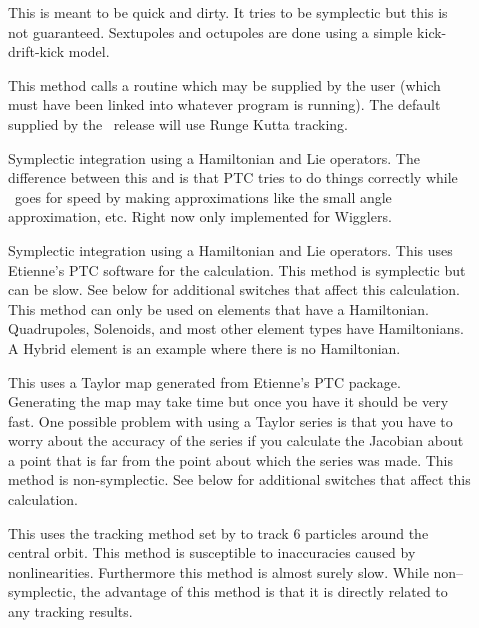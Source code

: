 \begin{description}

\item[]
This is meant to be quick and dirty. It tries to be symplectic but this
is not guaranteed. Sextupoles and octupoles are done using a simple
kick-drift-kick model.

\item[]
This method calls a routine  which may be supplied
by the user (which must have been linked into whatever program is
running).  The default  supplied by the \bmad\ release
will use Runge Kutta tracking. 

\item[]
Symplectic integration using a Hamiltonian and Lie operators. The
difference between this and  is that PTC tries to do things
correctly while \bmad\ goes for speed by making approximations like the small
angle approximation, etc. Right now only implemented for Wigglers.

\item[]
Symplectic integration using a Hamiltonian and Lie operators.
This uses Etienne's PTC software for the calculation.
This method is symplectic but can be slow. See below for additional switches
that affect this calculation. This method can only be used on elements that
have a Hamiltonian. Quadrupoles, Solenoids, and most other element types have
Hamiltonians. A Hybrid element is an example where there is no Hamiltonian.

\item[]
This uses a Taylor map generated from Etienne's PTC package. Generating
the map may take time but once you have it should be very fast. One
possible problem with using a Taylor series is that you have to worry about
the accuracy of the series if you calculate the Jacobian about a point that is
far from the point about which the series was made. This method is
non-symplectic. See below for additional switches that affect this
calculation.

\item[]
This uses the tracking method set by  to track 6
particles around the central orbit. This method is susceptible to inaccuracies
caused by nonlinearities. Furthermore this method
is almost surely slow. While non--symplectic, the advantage of this method
is that it is directly related to any tracking results.

\end{description}

